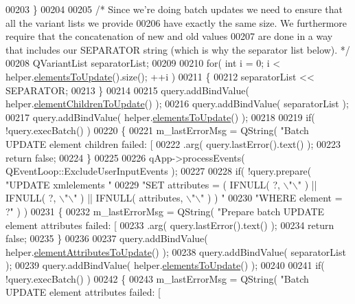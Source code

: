 \begin{DoxyCode}
{{{{{00203   \}
00204 
00205   \textcolor{comment}{/* Since we're doing batch updates we need to ensure that all the variant
       lists we provide}
00206 \textcolor{comment}{    have exactly the same size.  We furthermore require that the concatenation
       of new and old values}
00207 \textcolor{comment}{    are done in a way that includes our SEPARATOR string (which is why the
       separator list below). */}
00208   QVariantList separatorList;
00209 
00210   \textcolor{keywordflow}{for}( \textcolor{keywordtype}{int} i = 0; i < helper.\hyperlink{class_g_c_batch_processor_helper_aca0a2d6bbfcb23907e917b5d2251fc6f}{elementsToUpdate}().size(); ++i )
00211   \{
00212     separatorList << SEPARATOR;
00213   \}
00214 
00215   query.addBindValue( helper.\hyperlink{class_g_c_batch_processor_helper_a8fd4cac8af9a54df52a98628d5ba6fbe}{elementChildrenToUpdate}() );
00216   query.addBindValue( separatorList );
00217   query.addBindValue( helper.\hyperlink{class_g_c_batch_processor_helper_aca0a2d6bbfcb23907e917b5d2251fc6f}{elementsToUpdate}() );
00218 
00219   \textcolor{keywordflow}{if}( !query.execBatch() )
00220   \{
00221     m\_lastErrorMsg = QString( \textcolor{stringliteral}{"Batch UPDATE element children failed: [%
00222         .arg( query.lastError().text() );
00223     \textcolor{keywordflow}{return} \textcolor{keyword}{false};
00224   \}
00225 
00226   qApp->processEvents( QEventLoop::ExcludeUserInputEvents );
00227 
00228   \textcolor{keywordflow}{if}( !query.prepare( \textcolor{stringliteral}{"UPDATE xmlelements "}
00229                       \textcolor{stringliteral}{"SET attributes = ( IFNULL( ?, \(\backslash\)"\(\backslash\)" ) || IFNULL( ?, \(\backslash\)"\(\backslash\)"
       ) || IFNULL( attributes, \(\backslash\)"\(\backslash\)" )  ) "}
00230                       \textcolor{stringliteral}{"WHERE element = ?"} ) )
00231   \{
00232     m\_lastErrorMsg = QString( \textcolor{stringliteral}{"Prepare batch UPDATE element attributes failed:
       [%
00233         .arg( query.lastError().text() );
00234     \textcolor{keywordflow}{return} \textcolor{keyword}{false};
00235   \}
00236 
00237   query.addBindValue( helper.\hyperlink{class_g_c_batch_processor_helper_a3b0630e9e210b2b86e58cb43d3706b73}{elementAttributesToUpdate}() );
00238   query.addBindValue( separatorList );
00239   query.addBindValue( helper.\hyperlink{class_g_c_batch_processor_helper_aca0a2d6bbfcb23907e917b5d2251fc6f}{elementsToUpdate}() );
00240 
00241   \textcolor{keywordflow}{if}( !query.execBatch() )
00242   \{
00243     m\_lastErrorMsg = QString( \textcolor{stringliteral}{"Batch UPDATE element attributes failed: [%
}}}}}}}}
\end{DoxyCode}
